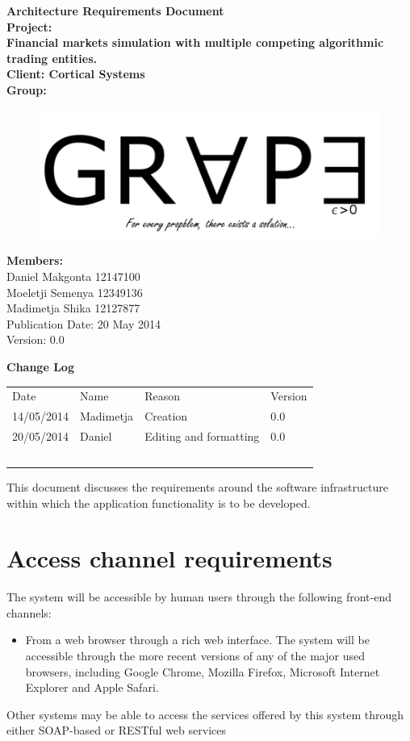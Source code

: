 \documentclass[12pt]{article}
\newcommand{\Title}{Architecture Requirements Document} %
\begin{document}
	\begin{center}%
		\LARGE \bf \Title \\[2em]
		\Large {Project:}\\
		Financial markets simulation with multiple competing algorithmic trading entities.\\[0.7em]
		\Large {Client:}
		Cortical Systems\\[2em]
		\LARGE {\bf Group:}\\
			\begin{figure}[ht!]
				\centering
				\includegraphics[scale=0.4]{Logo8.png}
			\end{figure}
			
		\Large {\bf Members:}\\[0.3em]
		\large
		Daniel Makgonta 12147100\\
		Moeletji Semenya 12349136\\
		Madimetja Shika 12127877\\[3em]
	
	\small Publication Date: 20 May 2014\\[0.5em]
	\small Version: 0.0 		    
	\end{center}%
	
	\newpage		
	\LARGE 
 	{\bf Change Log}\\[1em]
	\begin{tabular}{llll}
		Date & Name & Reason & Version \\
		14/05/2014 & Madimetja & Creation & 0.0 \\
		20/05/2014 & Daniel & Editing and formatting & 0.0 \\
		~ & ~ & ~ & ~ \\
	\end{tabular}
	

	\newpage
	\tableofcontents
				  
	\newpage
	This document discusses the requirements around the software infrastructure within which the application functionality is to be developed. 
	\section{Access channel requirements}
	The system will be accessible by human users through the following front-end channels:
	\begin{itemize}
	\item From a web browser through a rich web interface. The system will be accessible through the more recent versions of any of the major used browsers, including Google Chrome, Mozilla Firefox, Microsoft Internet Explorer and Apple Safari.
	\end{itemize}
	Other systems may be able to access the services offered by this system through either SOAP-based or RESTful web services
	
\end{document}
